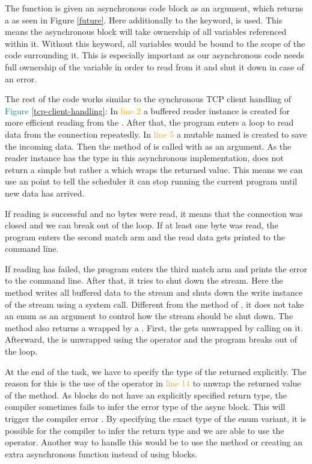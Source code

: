 The function is given an asynchronous code block as an argument, which returns a  as seen in Figure
\textcolor{teal}{\ref{future}}. Here additionally to the  keyword,  is used. This means the
asynchronous block will take ownership of all variables referenced within it. Without this keyword, all variables would
be bound to the scope of the code surrounding it. This is especially important as our asynchronous code needs full
ownership of the  variable in order to read from it and shut it down in case of an error.

The rest of the code works similar to the synchronous TCP client handling of
\textcolor{teal}{Figure \ref{tcp-client-handling}}: In \textcolor{orange}{line 2} a buffered reader instance is
created for more efficient reading from the . After that, the program enters a loop to read data from
the connection repeatedly. In \textcolor{orange}{line 5} a mutable  named  is created to save
the incoming data. Then the method  of  is called with  as an argument. As the
reader instance has the type  in this asynchronous implementation,  does not
return a simple  but rather a  which wraps the returned value. This means we can use an
 point to tell the scheduler it can stop running the current program until new data has arrived.

If reading is successful and no bytes were read, it means that the connection was closed and we can break out of the
loop. If at least one byte was read, the program enters the second match arm and the read data gets printed to the
command line.

If reading has failed, the program enters the third match arm and prints the error to the command line. After that, it
tries to shut down the stream. Here the  method writes all buffered data to the stream and shuts down
the write instance of the stream using a system call. Different from the  method of
, it does not take an enum as an argument to control how the stream should be shut down. The
method also returns a  wrapped by a . First, the  gets unwrapped by calling
 on it. Afterward, the  is unwrapped using the  operator and the program breaks out of
the loop.

At the end of the task, we have to specify the type of the  returned explicitly. The reason for this is
the use of the  operator in \textcolor{orange}{line 14} to unwrap the returned value of the 
method. As  blocks do not have an explicitly specified return type, the compiler sometimes fails to infer
the error type of the async block. This will trigger the compiler error . By
specifying the exact type of the  enum variant, it is possible for the compiler to infer the return type and
we are able to use the  operator. Another way to handle this would be to use the  method or
creating an extra asynchronous function instead of using  blocks. \cite{async-rust}

